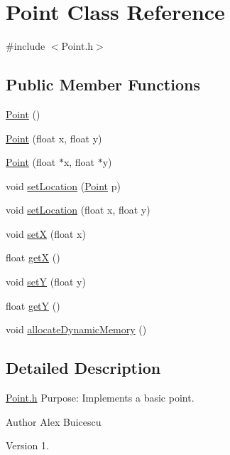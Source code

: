 \hypertarget{class_point}{}\section{Point Class Reference}
\label{class_point}


{\ttfamily \#include $<$Point.\+h$>$}

\subsection*{Public Member Functions}
\begin{DoxyCompactItemize}
\item 
\hyperlink{class_point_ad92f2337b839a94ce97dcdb439b4325a}{Point} ()
\item 
\hyperlink{class_point_a30bc8409287de4f43e160664be834636}{Point} (float x, float y)
\item 
\hyperlink{class_point_a3f9141c55bd9b8c1a26b3247715f14e0}{Point} (float $\ast$x, float $\ast$y)
\item 
void \hyperlink{class_point_a2db3e8414ece5a85163b36bc88cb4bcb}{set\+Location} (\hyperlink{class_point}{Point} p)
\item 
void \hyperlink{class_point_a5418a52b489545313962f997336cf2f3}{set\+Location} (float x, float y)
\item 
void \hyperlink{class_point_ac24951f100ad7704f06f59b9cc1956ba}{set\+X} (float x)
\item 
float \hyperlink{class_point_acc27466778cc87a662bba40268c4c0c8}{get\+X} ()
\item 
void \hyperlink{class_point_a18b8e100ef3ba704ac407cfc7451475c}{set\+Y} (float y)
\item 
float \hyperlink{class_point_a3cccbca94719ddde353cce86ce0e2f64}{get\+Y} ()
\item 
void \hyperlink{class_point_adbdbbd14db263daad674265a567393fc}{allocate\+Dynamic\+Memory} ()
\end{DoxyCompactItemize}


\subsection{Detailed Description}
\hyperlink{_point_8h_source}{Point.\+h} Purpose\+: Implements a basic point.

\begin{DoxyAuthor}{Author}
Alex Buicescu 
\end{DoxyAuthor}
\begin{DoxyVersion}{Version}
1. 
\end{DoxyVersion}


